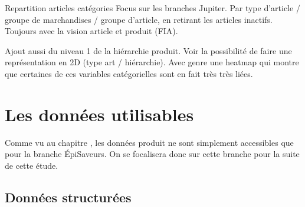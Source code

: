             Repartition articles catégories
            Focus sur les branches Jupiter.
            Par type d'article / groupe de marchandises / groupe d'article, en retirant les articles inactifs. Toujours avec la vision article et produit (FIA).

            Ajout aussi du niveau 1 de la hiérarchie produit. Voir la possibilité de faire une représentation en 2D (type art / hiérarchie). Avec genre une heatmap qui montre que certaines de ces variables catégorielles sont en fait très très liées.

    \chapter{Les données utilisables}
        \large
        Comme vu au chapitre , les données produit ne sont simplement accessibles que pour la branche \'{E}piSaveurs.
        On se focalisera donc sur cette branche pour la suite de cette étude.
        \normalsize

        \section{Données structurées}

